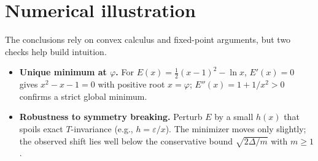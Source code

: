 \documentclass[11pt]{article}
\theoremstyle{remark}
\theoremstyle{definition}
\newcommand{\ph}{\varphi}
\newcommand{\eps}{\varepsilon}
\begin{document}
\section{Numerical illustration}
The conclusions rely on convex calculus and fixed-point arguments, but two checks help build intuition.
\begin{itemize}[leftmargin=1.15em]
  \item \textbf{Unique minimum at $\ph$.} For $E(x)=\tfrac12(x-1)^2-\ln x$, $E'(x)=0$ gives $x^2-x-1=0$ with positive root $x=\ph$; $E''(x)=1+1/x^2>0$ confirms a strict global minimum.
  \item \textbf{Robustness to symmetry breaking.} Perturb $E$ by a small $h(x)$ that spoils exact $T$-invariance (e.g., $h=\eps/x$). The minimizer moves only slightly; the observed shift lies well below the conservative bound $\sqrt{2\Delta/m}$ with $m\ge1$.
\end{itemize}
\end{document}
